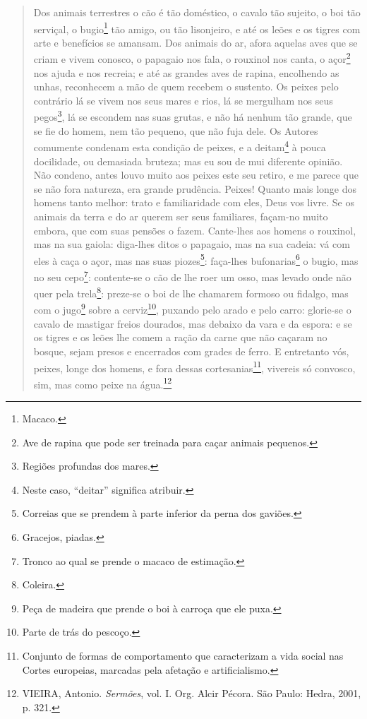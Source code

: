 \begin{quote}
Dos animais terrestres o cão é tão doméstico, o cavalo tão sujeito, o
boi tão serviçal, o bugio\footnote{Macaco.} tão amigo, ou tão
lisonjeiro, e até os leões e os tigres com arte e benefícios se amansam.
Dos animais do ar, afora aquelas aves que se criam e vivem conosco, o
papagaio nos fala, o rouxinol nos canta, o açor\footnote{Ave de rapina
  que pode ser treinada para caçar animais pequenos.} nos ajuda e nos
recreia; e até as grandes aves de rapina, encolhendo as unhas,
reconhecem a mão de quem recebem o sustento. Os peixes pelo contrário lá
se vivem nos seus mares e rios, lá se mergulham nos seus pegos\footnote{Regiões
  profundas dos mares.}, lá se escondem nas suas grutas, e não há nenhum
tão grande, que se fie do homem, nem tão pequeno, que não fuja dele. Os
Autores comumente condenam esta condição de peixes, e a deitam\footnote{Neste
  caso, ``deitar'' significa atribuir.} à pouca docilidade, ou demasiada
bruteza; mas eu sou de mui diferente opinião. Não condeno, antes louvo
muito aos peixes este seu retiro, e me parece que se não fora natureza,
era grande prudência. Peixes! Quanto mais longe dos homens tanto melhor:
trato e familiaridade com eles, Deus vos livre. Se os animais da terra e
do ar querem ser seus familiares, façam-no muito embora, que com suas
pensões o fazem. Cante-lhes aos homens o rouxinol, mas na sua gaiola:
diga-lhes ditos o papagaio, mas na sua cadeia: vá com eles à caça o
açor, mas nas suas piozes\footnote{Correias que se prendem à parte
  inferior da perna dos gaviões.}: faça-lhes bufonarias\footnote{Gracejos,
  piadas.} o bugio, mas no seu cepo\footnote{Tronco ao qual se prende o
  macaco de estimação.}: contente-se o cão de lhe roer um osso, mas
levado onde não quer pela trela\footnote{Coleira.}: preze-se o boi de
lhe chamarem formoso ou fidalgo, mas com o jugo\footnote{Peça de madeira
  que prende o boi à carroça que ele puxa.} sobre a cerviz\footnote{Parte
  de trás do pescoço.}, puxando pelo arado e pelo carro: glorie-se o
cavalo de mastigar freios dourados, mas debaixo da vara e da espora: e
se os tigres e os leões lhe comem a ração da carne que não caçaram no
bosque, sejam presos e encerrados com grades de ferro. E entretanto vós,
peixes, longe dos homens, e fora dessas cortesanias\footnote{Conjunto de
  formas de comportamento que caracterizam a vida social nas Cortes
  europeias, marcadas pela afetação e artificialismo.}, vivereis só
convosco, sim, mas como peixe na água.\footnote{VIEIRA, Antonio.
  \emph{Sermões}, vol. I. Org. Alcir Pécora. São Paulo: Hedra, 2001, p.
  321.}
\end{quote}

